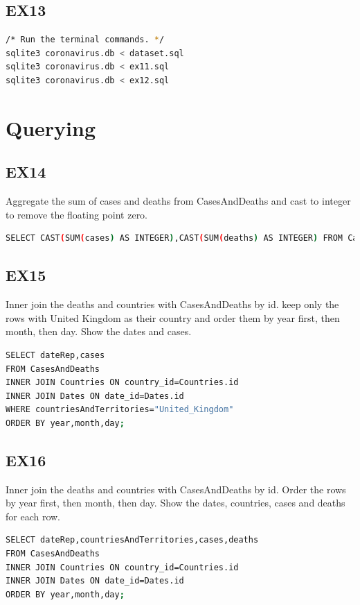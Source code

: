 \documentclass[12pt,oneside,a4paper,english]{article}
\begin{document}
\subsection{EX13}
\begin{lstlisting}[language=Bash]
/* Run the terminal commands. */
sqlite3 coronavirus.db < dataset.sql
sqlite3 coronavirus.db < ex11.sql
sqlite3 coronavirus.db < ex12.sql
\end{lstlisting}

\section{Querying}
\subsection{EX14}
\noindent Aggregate the sum of cases and deaths from CasesAndDeaths and cast to integer to remove the floating point zero.
\begin{lstlisting}[language=Bash]
SELECT CAST(SUM(cases) AS INTEGER),CAST(SUM(deaths) AS INTEGER) FROM CasesAndDeaths;
\end{lstlisting}

\subsection{EX15}
\noindent Inner join the deaths and countries with CasesAndDeaths by id. keep only the rows with United Kingdom as their country and order them by year first, then month, then day. Show the dates and cases.
\begin{lstlisting}[language=Bash]
SELECT dateRep,cases
FROM CasesAndDeaths
INNER JOIN Countries ON country_id=Countries.id
INNER JOIN Dates ON date_id=Dates.id
WHERE countriesAndTerritories="United_Kingdom"
ORDER BY year,month,day;
\end{lstlisting}

\subsection{EX16}
\noindent Inner join the deaths and countries with CasesAndDeaths by id. Order the rows by year first, then month, then day. Show the dates, countries, cases and deaths for each row.
\begin{lstlisting}[language=Bash]
SELECT dateRep,countriesAndTerritories,cases,deaths
FROM CasesAndDeaths
INNER JOIN Countries ON country_id=Countries.id
INNER JOIN Dates ON date_id=Dates.id
ORDER BY year,month,day;
\end{lstlisting}
\end{document}
